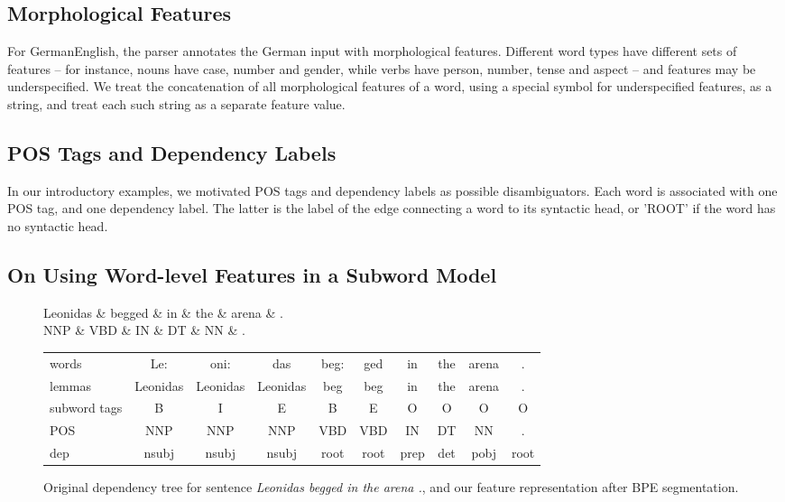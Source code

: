\documentclass[11pt]{article}
\begin{document}
\subsection{Morphological Features}

For GermanEnglish, the parser annotates the German input with morphological features.
Different word types have different sets of features -- for instance, nouns have case, number and gender, while verbs have person, number, tense and aspect -- and features may be underspecified.
We treat the concatenation of all morphological features of a word, using a special symbol for underspecified features, as a string, and treat each such string as a separate feature value.

\subsection{POS Tags and Dependency Labels}

In our introductory examples, we motivated POS tags and dependency labels as possible disambiguators.
Each word is associated with one POS tag, and one dependency label.
The latter is the label of the edge connecting a word to its syntactic head, or 'ROOT' if the word has no syntactic head.

\subsection{On Using Word-level Features in a Subword Model}

\begin{figure*}
\centering
\small
\begin{dependency}[theme = simple, label style={scale=1.5}]
   \begin{deptext}[column sep=10pt]
      Leonidas \& begged \& in \& the \& arena \& . \\
      NNP \& VBD \& IN \& DT \& NN \& .\\
   \end{deptext}
\end{dependency}
\begin{tabular}{|l|ccccccccc|}
\hline
words & Le: & oni: & das & beg: & ged & in & the & arena & .\\
lemmas & Leonidas & Leonidas & Leonidas & beg & beg & in & the & arena & .\\
subword tags & B & I & E & B & E & O & O & O & O \\
POS & NNP & NNP & NNP & VBD & VBD & IN & DT & NN & .\\
dep & nsubj & nsubj & nsubj & root & root & prep & det & pobj & root \\
\hline
\end{tabular}
\caption{Original dependency tree for sentence \emph{Leonidas begged in the arena .}, and our feature representation after BPE segmentation.}
\label{example-figure}
\end{figure*}
\end{document}
